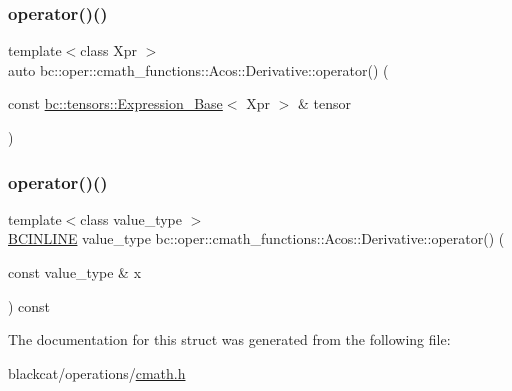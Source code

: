 \mbox{\label{structbc_1_1oper_1_1cmath__functions_1_1Acos_1_1Derivative_a65ab425c53962ae36c86093278cf701e}} 
\subsubsection{\texorpdfstring{operator()()}{operator()()}\hspace{0.1cm}{\footnotesize\ttfamily [2/3]}}
{\footnotesize\ttfamily template$<$class Xpr $>$ \\
auto bc\+::oper\+::cmath\+\_\+functions\+::\+Acos\+::\+Derivative\+::operator() (\begin{DoxyParamCaption}\item[{const \hyperlink{classbc_1_1tensors_1_1Expression__Base}{bc\+::tensors\+::\+Expression\+\_\+\+Base}$<$ Xpr $>$ \&}]{tensor }\end{DoxyParamCaption})\hspace{0.3cm}{\ttfamily [inline]}}

\mbox{\label{structbc_1_1oper_1_1cmath__functions_1_1Acos_1_1Derivative_a8d0cacc5929d927d1b24c583b4f35b25}} 
\subsubsection{\texorpdfstring{operator()()}{operator()()}\hspace{0.1cm}{\footnotesize\ttfamily [3/3]}}
{\footnotesize\ttfamily template$<$class value\+\_\+type $>$ \\
\hyperlink{common_8h_a6699e8b0449da5c0fafb878e59c1d4b1}{B\+C\+I\+N\+L\+I\+NE} value\+\_\+type bc\+::oper\+::cmath\+\_\+functions\+::\+Acos\+::\+Derivative\+::operator() (\begin{DoxyParamCaption}\item[{const value\+\_\+type \&}]{x }\end{DoxyParamCaption}) const\hspace{0.3cm}{\ttfamily [inline]}}



The documentation for this struct was generated from the following file\+:\begin{DoxyCompactItemize}
\item 
blackcat/operations/\hyperlink{cmath_8h}{cmath.\+h}\end{DoxyCompactItemize}
